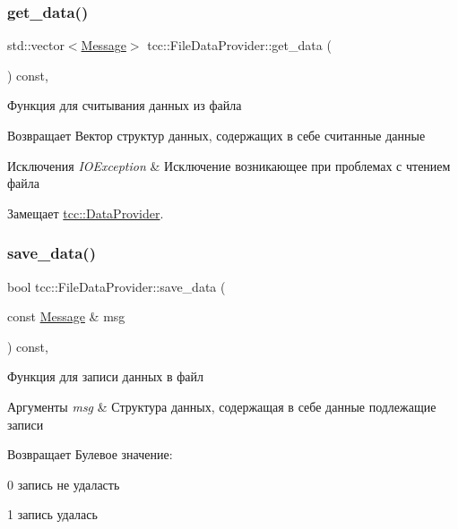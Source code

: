 \subsubsection{\texorpdfstring{get\+\_\+data()}{get\_data()}}
{\footnotesize\ttfamily std\+::vector$<$\mbox{\hyperlink{classtcc_1_1_message}{Message}}$>$ tcc\+::\+File\+Data\+Provider\+::get\+\_\+data (\begin{DoxyParamCaption}{ }\end{DoxyParamCaption}) const\hspace{0.3cm}{\ttfamily [override]}, {\ttfamily [virtual]}}



Функция для считывания данных из файла 

\begin{DoxyReturn}{Возвращает}
Вектор структур данных, содержащих в себе считанные данные 
\end{DoxyReturn}

\begin{DoxyExceptions}{Исключения}
{\em I\+O\+Exception} & Исключение возникающее при проблемах с чтением файла \\
\hline
\end{DoxyExceptions}


Замещает \mbox{\hyperlink{classtcc_1_1_data_provider}{tcc\+::\+Data\+Provider}}.

\mbox{\label{classtcc_1_1_file_data_provider_a969360abf9313a4b81de0af227025fa0}} 
\subsubsection{\texorpdfstring{save\+\_\+data()}{save\_data()}}
{\footnotesize\ttfamily bool tcc\+::\+File\+Data\+Provider\+::save\+\_\+data (\begin{DoxyParamCaption}\item[{const \mbox{\hyperlink{classtcc_1_1_message}{Message}} \&}]{msg }\end{DoxyParamCaption}) const\hspace{0.3cm}{\ttfamily [override]}, {\ttfamily [virtual]}}



Функция для записи данных в файл 


\begin{DoxyParams}{Аргументы}
{\em msg} & Структура данных, содержащая в себе данные подлежащие записи \\
\hline
\end{DoxyParams}
\begin{DoxyReturn}{Возвращает}
Булевое значение\+:
\begin{DoxyItemize}
\item 0 запись не удаласть
\item 1 запись удалась 
\end{DoxyItemize}
\end{DoxyReturn}


